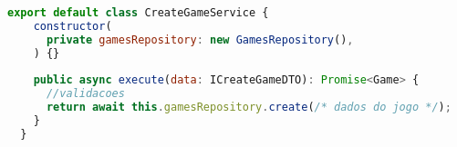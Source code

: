 \begin{lstlisting}[language=JavaScript, caption={O Caso de Uso},captionpos=b, label=alg:dip_violation]
  export default class CreateGameService {
    constructor(
      private gamesRepository: new GamesRepository(),
    ) {}
  
    public async execute(data: ICreateGameDTO): Promise<Game> {
      //validacoes
      return await this.gamesRepository.create(/* dados do jogo */);
    }
  }
\end{lstlisting}

